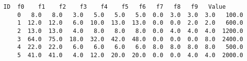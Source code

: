 \begin{lstlisting}[caption={Rappresentazione sotto forma tabellare dell'istanza precedente}]
    ID  f0    f1    f2    f3    f4    f5   f6   f7   f8   f9   Value
    0   8.0   8.0   3.0   5.0   5.0   5.0  0.0  3.0  3.0  3.0   100.0
    1  12.0  12.0   6.0  10.0  13.0  13.0  0.0  0.0  2.0  2.0   600.0
    2  13.0  13.0   4.0   8.0   8.0   8.0  0.0  4.0  4.0  4.0  1200.0
    3  64.0  75.0  18.0  32.0  42.0  48.0  0.0  0.0  0.0  8.0  2400.0
    4  22.0  22.0   6.0   6.0   6.0   6.0  8.0  8.0  8.0  8.0   500.0
    5  41.0  41.0   4.0  12.0  20.0  20.0  0.0  0.0  4.0  4.0  2000.0
\end{lstlisting}
%
